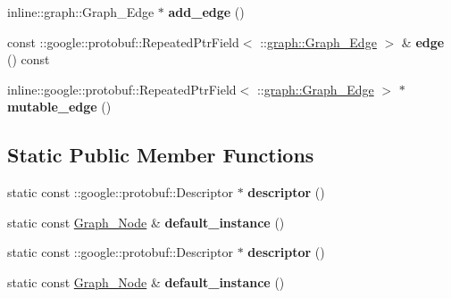 \begin{DoxyCompactItemize}
\item 
\hypertarget{classgraph_1_1Graph__Node_a1217ffa590fdd95eab7d8f9d3b464b4a}{
inline::graph::Graph\_\-Edge $\ast$ {\bfseries add\_\-edge} ()}
\label{classgraph_1_1Graph__Node_a1217ffa590fdd95eab7d8f9d3b464b4a}

\item 
\hypertarget{classgraph_1_1Graph__Node_a39199d3d605e718a856c869eed3ba256}{
const ::google::protobuf::RepeatedPtrField$<$ ::\hyperlink{classgraph_1_1Graph__Edge}{graph::Graph\_\-Edge} $>$ \& {\bfseries edge} () const }
\label{classgraph_1_1Graph__Node_a39199d3d605e718a856c869eed3ba256}

\item 
\hypertarget{classgraph_1_1Graph__Node_a3ec630a7375b6c99d6a2808a5f9e430e}{
inline::google::protobuf::RepeatedPtrField$<$ ::\hyperlink{classgraph_1_1Graph__Edge}{graph::Graph\_\-Edge} $>$ $\ast$ {\bfseries mutable\_\-edge} ()}
\label{classgraph_1_1Graph__Node_a3ec630a7375b6c99d6a2808a5f9e430e}

\end{DoxyCompactItemize}
\subsection*{Static Public Member Functions}
\begin{DoxyCompactItemize}
\item 
\hypertarget{classgraph_1_1Graph__Node_a979891540d461fa3c5d04e697a9f404e}{
static const ::google::protobuf::Descriptor $\ast$ {\bfseries descriptor} ()}
\label{classgraph_1_1Graph__Node_a979891540d461fa3c5d04e697a9f404e}

\item 
\hypertarget{classgraph_1_1Graph__Node_a205f84598c3087dc21ac328b25f0d7f6}{
static const \hyperlink{classgraph_1_1Graph__Node}{Graph\_\-Node} \& {\bfseries default\_\-instance} ()}
\label{classgraph_1_1Graph__Node_a205f84598c3087dc21ac328b25f0d7f6}

\item 
\hypertarget{classgraph_1_1Graph__Node_a2a1ebf9c3fc400c7d650576338e3fa97}{
static const ::google::protobuf::Descriptor $\ast$ {\bfseries descriptor} ()}
\label{classgraph_1_1Graph__Node_a2a1ebf9c3fc400c7d650576338e3fa97}

\item 
\hypertarget{classgraph_1_1Graph__Node_a9cd51eafd2aadb24dc3af6ca9fd67051}{
static const \hyperlink{classgraph_1_1Graph__Node}{Graph\_\-Node} \& {\bfseries default\_\-instance} ()}
\label{classgraph_1_1Graph__Node_a9cd51eafd2aadb24dc3af6ca9fd67051}

\end{DoxyCompactItemize}
